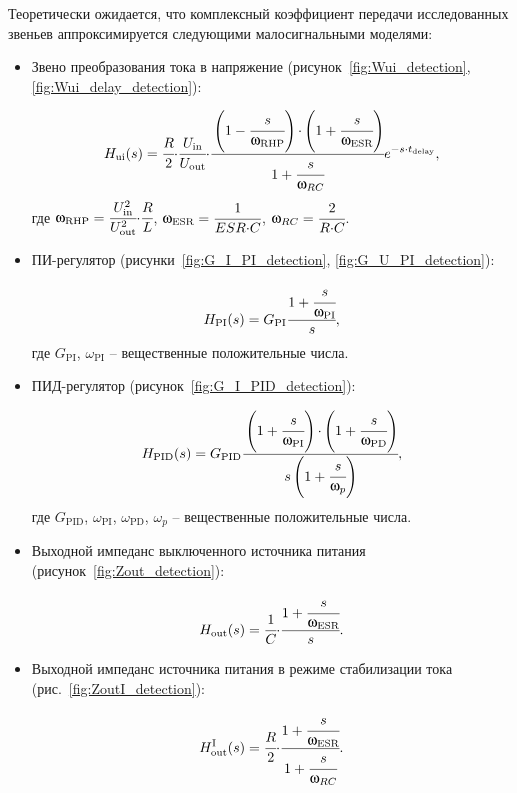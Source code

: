 Теоретически ожидается, что комплексный коэффициент передачи исследованных звеньев аппроксимируется следующими малосигнальными моделями:
\begin{itemize}
	\item Звено преобразования тока в напряжение (рисунок~\ref{fig:Wui_detection}, \ref{fig:Wui_delay_detection}):\par
	\begin{equation*}
		H_\text{ui}(s) = \cfrac{R}{2} \mathord{\cdot} \cfrac{U_\text{in}}{U_\text{out}} \mathord{\cdot} \cfrac{\left(1 - \cfrac{s}{\omega_\text{RHP}} \right) \mathord{\cdot} \left(1 + \cfrac{s}{\omega_\text{ESR}} \right)}{1 + \cfrac{s}{\omega_{RC}}} e^{-s \mathord{\cdot} t_\text{delay}},
	\end{equation*}
	где ${\omega_\text{RHP} = \cfrac{U_\text{in}^2}{U_\text{out}^2} \mathord{\cdot} \cfrac{R}{L}}$, ${\omega_\text{ESR} = \cfrac{1}{ESR \mathord{\cdot} C}}$, ${\omega_{RC} = \cfrac{2}{R \mathord{\cdot} C}}$.

	\item ПИ-регулятор (рисунки~\ref{fig:G_I_PI_detection}, \ref{fig:G_U_PI_detection}):\par
	\begin{equation*}
		H_\text{PI}(s) = G_\text{PI} \cfrac{1 + \cfrac{s}{\omega_\text{PI}}}{s},
	\end{equation*}
	где ${G_\text{PI}}$, ${\omega_\text{PI}}$ -- вещественные положительные числа.
	
	\item ПИД-регулятор (рисунок~\ref{fig:G_I_PID_detection}):\par
	\begin{equation*}
		H_\text{PID}(s) = G_\text{PID} \cfrac{\left(1 + \cfrac{s}{\omega_\text{PI}}\right) \mathord{\cdot} \left(1 + \cfrac{s}{\omega_\text{PD}}\right)}{s \left(1 + \cfrac{s}{\omega_p}\right)},
	\end{equation*}
	где ${G_\text{PID}}$, ${\omega_\text{PI}}$, ${\omega_\text{PD}}$, ${\omega_p}$ -- вещественные положительные числа.
	
	\item Выходной импеданс выключенного источника питания (рисунок~\ref{fig:Zout_detection}):\par
	\begin{equation*}
		H_\text{out}(s) = \cfrac{1}{C} \mathord{\cdot} \cfrac{1 + \cfrac{s}{\omega_\text{ESR}}}{s}.
	\end{equation*}
	
	\item Выходной импеданс источника питания в режиме стабилизации тока (рис.~\ref{fig:ZoutI_detection}):\par
	\begin{equation*}
		H_\text{out}^\text{I}(s) = \cfrac{R}{2} \mathord{\cdot} \cfrac{1 + \cfrac{s}{\omega_\text{ESR}}}{1 + \cfrac{s}{ \omega_{RC}}}.
	\end{equation*}
\end{itemize}

